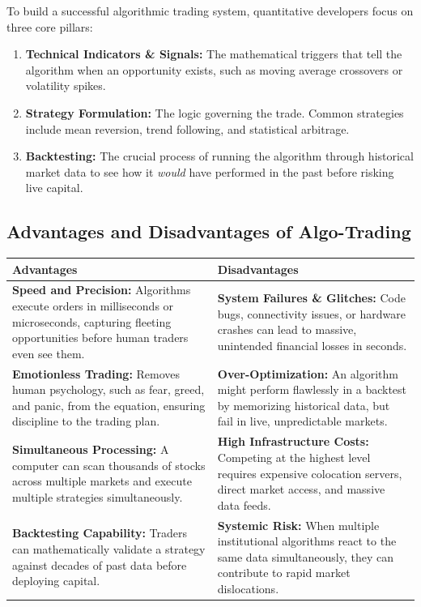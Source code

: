 \documentclass[12pt,openany]{book}
\begin{document}
To build a successful algorithmic trading system, quantitative developers focus on three core pillars:

\begin{enumerate}[leftmargin=*]
    \item \textbf{Technical Indicators \& Signals:} The mathematical triggers that tell the algorithm when an opportunity exists, such as moving average crossovers or volatility spikes.
    \item \textbf{Strategy Formulation:} The logic governing the trade. Common strategies include mean reversion, trend following, and statistical arbitrage.
    \item \textbf{Backtesting:} The crucial process of running the algorithm through historical market data to see how it \emph{would} have performed in the past before risking live capital.
\end{enumerate}

\subsection{Advantages and Disadvantages of Algo-Trading}

\begingroup
\small
\setlength{\tabcolsep}{4pt}
\begin{center}
\begin{tabular}{|L{0.43\textwidth}|L{0.43\textwidth}|}
\hline
\textbf{Advantages} & \textbf{Disadvantages} \\
\hline
\textbf{Speed and Precision:} Algorithms execute orders in milliseconds or microseconds, capturing fleeting opportunities before human traders even see them. & \textbf{System Failures \& Glitches:} Code bugs, connectivity issues, or hardware crashes can lead to massive, unintended financial losses in seconds. \\
\hline
\textbf{Emotionless Trading:} Removes human psychology, such as fear, greed, and panic, from the equation, ensuring discipline to the trading plan. & \textbf{Over-Optimization:} An algorithm might perform flawlessly in a backtest by memorizing historical data, but fail in live, unpredictable markets. \\
\hline
\textbf{Simultaneous Processing:} A computer can scan thousands of stocks across multiple markets and execute multiple strategies simultaneously. & \textbf{High Infrastructure Costs:} Competing at the highest level requires expensive colocation servers, direct market access, and massive data feeds. \\
\hline
\textbf{Backtesting Capability:} Traders can mathematically validate a strategy against decades of past data before deploying capital. & \textbf{Systemic Risk:} When multiple institutional algorithms react to the same data simultaneously, they can contribute to rapid market dislocations. \\
\hline
\end{tabular}
\end{center}
\endgroup
\end{document}

